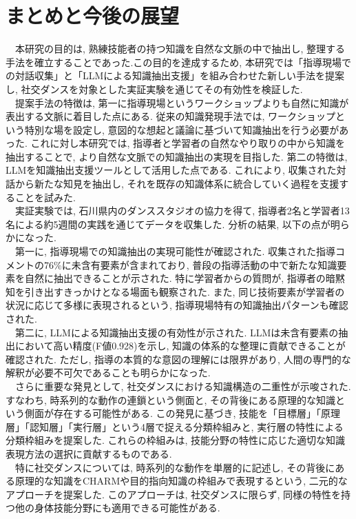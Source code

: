 \chapter{まとめと今後の展望}
　本研究の目的は, 熟練技能者の持つ知識を自然な文脈の中で抽出し, 整理する手法を確立することであった.この目的を達成するため, 本研究では「指導現場での対話収集」と「LLMによる知識抽出支援」を組み合わせた新しい手法を提案し, 社交ダンスを対象とした実証実験を通じてその有効性を検証した.\\
　提案手法の特徴は, 第一に指導現場というワークショップよりも自然に知識が表出する文脈に着目した点にある. 従来の知識発現手法では, ワークショップという特別な場を設定し, 意図的な想起と議論に基づいて知識抽出を行う必要があった. これに対し本研究では, 指導者と学習者の自然なやり取りの中から知識を抽出することで, より自然な文脈での知識抽出の実現を目指した. 第二の特徴は, LLMを知識抽出支援ツールとして活用した点である. これにより, 収集された対話から新たな知見を抽出し, それを既存の知識体系に統合していく過程を支援することを試みた. \\
　実証実験では, 石川県内のダンススタジオの協力を得て, 指導者2名と学習者13名による約5週間の実践を通じてデータを収集した. 分析の結果, 以下の点が明らかになった.\\
　第一に, 指導現場での知識抽出の実現可能性が確認された. 収集された指導コメントの76\%に未含有要素が含まれており, 普段の指導活動の中で新たな知識要素を自然に抽出できることが示された. 特に学習者からの質問が, 指導者の暗黙知を引き出すきっかけとなる場面も観察された. また, 同じ技術要素が学習者の状況に応じて多様に表現されるという, 指導現場特有の知識抽出パターンも確認された.\\
　第二に, LLMによる知識抽出支援の有効性が示された. LLMは未含有要素の抽出において高い精度(F値0.928)を示し, 知識の体系的な整理に貢献できることが確認された. ただし, 指導の本質的な意図の理解には限界があり, 人間の専門的な解釈が必要不可欠であることも明らかになった.\\
　さらに重要な発見として, 社交ダンスにおける知識構造の二重性が示唆された. すなわち, 時系列的な動作の連鎖という側面と, その背後にある原理的な知識という側面が存在する可能性がある. この発見に基づき, 技能を「目標層」「原理層」「認知層」「実行層」という4層で捉える分類枠組みと, 実行層の特性による分類枠組みを提案した. これらの枠組みは, 技能分野の特性に応じた適切な知識表現方法の選択に貢献するものである.\\
　特に社交ダンスについては, 時系列的な動作を単層的に記述し, その背後にある原理的な知識をCHARMや目的指向知識の枠組みで表現するという, 二元的なアプローチを提案した. このアプローチは, 社交ダンスに限らず, 同様の特性を持つ他の身体技能分野にも適用できる可能性がある.\\
